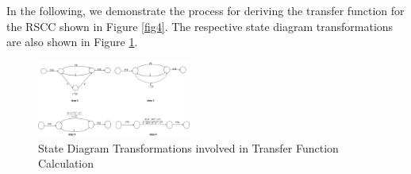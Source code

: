 \documentclass[conference]{IEEEtran}
\begin{document}
In the following, we demonstrate the process for deriving the transfer function for the RSCC shown in Figure {\ref{fig4}}. The respective state diagram transformations are also shown in Figure {\ref{fig5}}.

\begin{figure}[h!]
\centering
		\includegraphics[width=0.45\textwidth]{tfexample.png}
		\caption{State Diagram Transformations involved in Transfer Function Calculation }
		\label{fig5}
		\end{figure}
\end{document}
